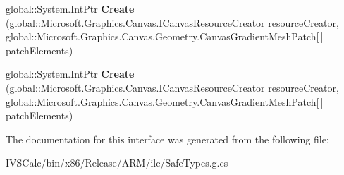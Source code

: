 \begin{DoxyCompactItemize}
\item 
\mbox{\label{interface_microsoft_1_1_graphics_1_1_canvas_1_1_geometry_1_1_i_canvas_gradient_mesh_factory_a89f013422e719c6aa2c18bcbf8c3df20}} 
global\+::\+System.\+Int\+Ptr {\bfseries Create} (global\+::\+Microsoft.\+Graphics.\+Canvas.\+I\+Canvas\+Resource\+Creator resource\+Creator, global\+::\+Microsoft.\+Graphics.\+Canvas.\+Geometry.\+Canvas\+Gradient\+Mesh\+Patch\mbox{[}$\,$\mbox{]} patch\+Elements)
\item 
\mbox{\label{interface_microsoft_1_1_graphics_1_1_canvas_1_1_geometry_1_1_i_canvas_gradient_mesh_factory_a89f013422e719c6aa2c18bcbf8c3df20}} 
global\+::\+System.\+Int\+Ptr {\bfseries Create} (global\+::\+Microsoft.\+Graphics.\+Canvas.\+I\+Canvas\+Resource\+Creator resource\+Creator, global\+::\+Microsoft.\+Graphics.\+Canvas.\+Geometry.\+Canvas\+Gradient\+Mesh\+Patch\mbox{[}$\,$\mbox{]} patch\+Elements)
\end{DoxyCompactItemize}


The documentation for this interface was generated from the following file\+:\begin{DoxyCompactItemize}
\item 
I\+V\+S\+Calc/bin/x86/\+Release/\+A\+R\+M/ilc/Safe\+Types.\+g.\+cs\end{DoxyCompactItemize}
